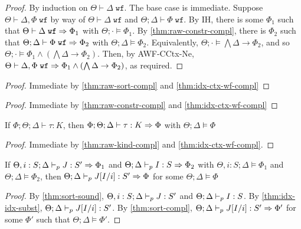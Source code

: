 \idxctxwfcompl*
\begin{proof}
By induction on $\Theta \vdash \Delta \; \texttt{wf}$. The base case is immediate.
Suppose $\Theta \vdash \Delta,\Phi \; \texttt{wf}$ by way of $\Theta \vdash \Delta \; \texttt{wf}$ and $\Theta ; \Delta \vdash \Phi \; \texttt{wf}$.
By IH, there is some $\Phi_1$ such that $\Theta \vdash \Delta \; \texttt{wf} \Rightarrow \Phi_1$ with $\Theta ; \cdot \vDash \Phi_1$. By \autoref{thm:raw-constr-compl}, there is $\Phi_2$ such that $\Theta ; \Delta \vdash \Phi \; \texttt{wf} \Rightarrow \Phi_2$ with $\Theta ; \Delta \vDash \Phi_2$. Equivalently, $\Theta ; \cdot \vDash \bigwedge \Delta \to \Phi_2$, and so $\Theta ; \cdot \vDash \Phi_1 \wedge (\bigwedge \Delta \to \Phi_2)$. Then, by AWF-CCtx-Ne, $\Theta \vdash \Delta,\Phi \; \texttt{wf} \Rightarrow \Phi_1 \wedge (\bigwedge \Delta \to \Phi_2)$, as required.
\end{proof}

\sortcompl*
\begin{proof}
Immediate by \autoref{thm:raw-sort-compl} and \autoref{thm:idx-ctx-wf-compl}
\end{proof}

\constrcompl*
\begin{proof}
Immediate by \autoref{thm:raw-constr-compl} and \autoref{thm:idx-ctx-wf-compl}
\end{proof}

\begin{theorem}
If $\Phi;\Theta;\Delta \vdash \tau : K$, then $\Phi;\Theta;\Delta \vdash \tau : K \Rightarrow \Phi$ with $\Theta ; \Delta \vDash \Phi$
\label{thm:raw-kind-compl}
\end{theorem}

\kindcompl*
\begin{proof}
Immediate by \autoref{thm:raw-kind-compl} and \autoref{thm:idx-ctx-wf-compl}.
\end{proof}

\subtynerefl*

\subtynfrefl*

\subtynftrans*


\begin{theorem}
If $\Theta, i : S ; \Delta \vdash_p J : S' \Rightarrow \Phi_1$ and $\Theta ; \Delta \vdash_p I : S \Rightarrow \Phi_2$ with
$\Theta, i : S ; \Delta \vDash \Phi_1$ and $\Theta; \Delta \vDash \Phi_2$, then
$\Theta ; \Delta \vdash_p J[I/i] : S' \Rightarrow \Phi$ for some $\Theta ; \Delta \vDash \Phi$
\label{idx-idx-algo-subst}
\end{theorem}
\begin{proof}
By \autoref{thm:sort-sound}, $\Theta, i :S ; \Delta \vdash_p J : S'$ and $\Theta ; \Delta \vdash_p I : S$.
By \autoref{thm:idx-idx-subst}, $\Theta ; \Delta \vdash_p J[I/i] : S'$.
By \autoref{thm:sort-compl}, $\Theta ; \Delta \vdash_p J[I/i] : S' \Rightarrow \Phi'$ for some $\Phi'$ such that $\Theta ; \Delta \vDash \Phi'$.
\end{proof}

